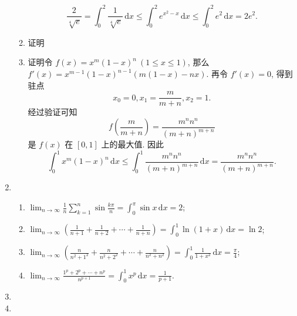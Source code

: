 \documentclass[a4paper, 11pt]{ctexart}
\newcommand{\dif}{\mathrm{d}}
\begin{document}
\begin{enumerate}
\begin{enumerate}[(1)]
                \[
                    \frac{2}{\sqrt[4]{e}} = \int_0^2 \frac{1}{\sqrt[4]{e}}\,\dif x \leqslant \int_0^2 e^{x^2-x}\,\dif x \leqslant \int_0^2 e^2\,\dif x = 2e^2.  
                \]
            \item %
                {\heiti 证明}\quad
            \item %
                {\heiti 证明}\quad 令 $f(x) = x^m(1-x)^n\ (1 \leqslant x \leqslant 1)$, 那么 $f'(x) = x^{m-1}(1-x)^{n-1}(m(1-x) - nx)$. 再令 $f'(x) = 0$, 得到驻点
                \[
                    x_0 = 0, x_1 = \frac{m}{m+n}, x_2 = 1.    
                \]
                经过验证可知
                \[
                    f\left(\frac{m}{m+n}\right) = \frac{m^nn^n}{(m+n)^{m+n}}
                \]
                是 $f(x)$ 在 $[0, 1]$ 上的最大值. 因此
                \[
                    \int_0^1 x^m(1-x)^n\,\dif x \leqslant \int_0^1 \frac{m^nn^n}{(m+n)^{m+n}}\,\dif x = \frac{m^nn^n}{(m+n)^{m+n}}.  
                \]
        \end{enumerate}
    \item %
        \begin{enumerate}[(1)]
            \item %
                $\displaystyle{
                    \lim_{n\to\infty}\frac1n\sum_{k=1}^{n}\sin\frac{k\pi}{n} = \int_0^\pi\sin x\,\dif x = 2
                }$;
            \item %
                $\displaystyle{
                    \lim_{n\to\infty}\left(\frac{1}{n+1} + \frac{1}{n+2} + \cdots + \frac{1}{n+n}\right) = \int_0^1\ln(1+x)\,\dif x = \ln2
                }$;
            \item %
                $\displaystyle{
                    \lim_{n\to\infty}\left(\frac{n}{n^2+1^2} + \frac{n}{n^2+2^2} + \cdots + \frac{n}{n^2+n^2}\right) = \int_0^1\frac{1}{1+x^2}\,\dif x = \frac{\pi}{4}
                }$;
            \item %
                $\displaystyle{
                    \lim_{n\to\infty}\frac{1^p + 2^p + \cdots + n^p}{n^{p+1}} = \int_0^1x^p\,\dif x = \frac{1}{p+1}
                }$.
        \end{enumerate}
    \item %
    \item %
\end{enumerate}
\end{document}
